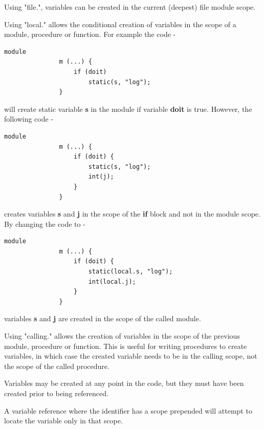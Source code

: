             Using "file.", variables can be created in the current (deepest)
            file module scope.
           
            Using "local." allows the conditional creation of variables in
            the scope of a module, procedure or function. For example the
            code -
            \begin{lstlisting}[gobble=12, language=threepl]
               module
               m (...) {
                   if (doit)
                       static(s, "log");
               }
            \end{lstlisting}
            will create static variable {\bf s} in the module if variable
            {\bf doit} is true. However, the following code -
            \begin{lstlisting}[gobble=12, language=threepl]
               module
               m (...) {
                   if (doit) {
                       static(s, "log");
                       int(j);
                   }
               }
            \end{lstlisting}
            creates variables {\bf s} and {\bf j} in the scope of the
            {\bf if} block and not in the module scope. By changing
            the code to -
            \begin{lstlisting}[gobble=12, language=threepl]
               module
               m (...) {
                   if (doit) {
                       static(local.s, "log");
                       int(local.j);
                   }
               }
            \end{lstlisting}
            variables {\bf s} and {\bf j} are created in the scope of
            the called module.
            
            Using "calling." allows the creation of variables in
            the scope of the previous module, procedure or function.
            This is useful for writing procedures to create variables, in
            which case the created variable needs to be in the calling
            scope, not the scope of the called procedure.

            Variables may be created at any point in the code, but they
            must have been created prior to being referenced.

            A variable reference where the identifier has a scope prepended
            will attempt to locate the variable only in that scope.

